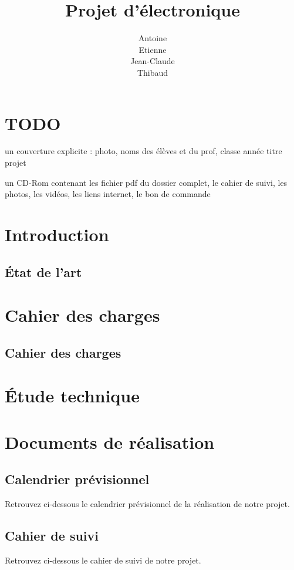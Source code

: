 \documentclass[12pt,titlepage,a4paper]{report}
\title{Projet d'électronique}
\author{Antoine \bsc{Augusti}\\ Etienne \bsc{Batise}\\ Jean-Claude \bsc{Bernard}\\ Thibaud \bsc{Dauce}}
\begin{document}

	\dominitoc
	\tableofcontents

	\setcounter{page}{1}
	\part{TODO}
	un couverture explicite : photo, noms des élèves et du prof, classe année titre projet

	un CD-Rom contenant les fichier pdf du dossier complet, le cahier de suivi, les photos, les vidéos, les liens internet, le bon de commande

	
	\part{Introduction}
	\chapter{État de l'art}
	\minitoc
	


	\part{Cahier des charges}
	\chapter{Cahier des charges}
	


	\part{Étude technique}


	\part{Documents de réalisation}
	\chapter{Calendrier prévisionnel}
	Retrouvez ci-dessous le calendrier prévisionnel de la réalisation de notre projet.
	
	
	\chapter{Cahier de suivi}
	\minitoc
	Retrouvez ci-dessous le cahier de suivi de notre projet.
	
\end{document}
